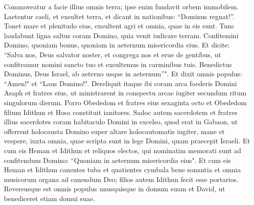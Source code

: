 \begin{biblechapter}
\verse Commoveatur a facie illius omnis terra; ipse enim fundavit orbem immobilem. 
\verse Laetentur caeli, et exsultet terra, et dicant in nationibus: “Dominus regnat!”. 
\verse Tonet mare et plenitudo eius, exsultent agri et omnia, quae in eis sunt. 
\verse Tunc laudabunt ligna saltus coram Domino, quia venit iudicare terram. 
\verse Confitemini Domino, quoniam bonus, quoniam in aeternum misericordia eius. 
\verse Et dicite: “Salva nos, Deus salvator noster, et congrega nos et erue de gentibus, ut confiteamur nomini sancto tuo et exsultemus in carminibus tuis. 
\verse Benedictus Dominus, Deus Israel, ab aeterno usque in aeternum”". Et dixit omnis populus: “Amen!" et “Laus Domino!". 
\verse Dereliquit itaque ibi coram arca foederis Domini Asaph et fratres eius, ut ministrarent in conspectu arcae iugiter secundum ritum singulorum dierum. 
\verse Porro Obededom et fratres eius sexaginta octo et Obededom filium Idithun et Hosa constituit ianitores. 
\verse Sadoc autem sacerdotem et fratres illius sacerdotes coram habitaculo Domini in excelso, quod erat in Gabaon, 
\verse ut offerrent holocausta Domino super altare holocautomatis iugiter, mane et vespere, iuxta omnia, quae scripta sunt in lege Domini, quam praecepit Israeli. 
\verse Et cum eis Heman et Idithun et reliquos electos, qui nominatim memorati sunt ad confitendum Domino: “Quoniam in aeternum misericordia eius". 
\verse Et cum eis Heman et Idithun canentes tuba et quatientes cymbala bene sonantia et omnia musicorum organa ad canendum Deo; filios autem Idithun fecit esse portarios. 
\verse Reversusque est omnis populus unusquisque in domum suam et David, ut benediceret etiam domui suae. 
\end{biblechapter}


